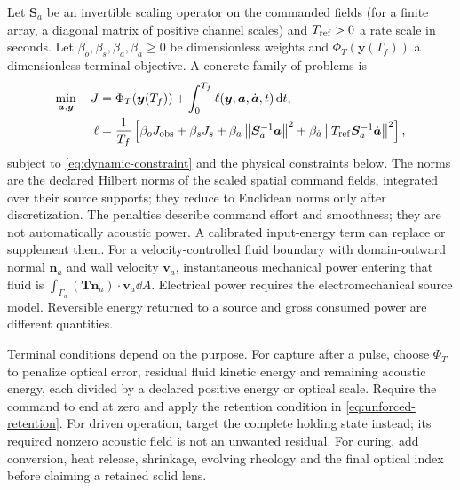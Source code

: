 Let $\bm S_a$ be an invertible scaling operator on the commanded fields
(for a finite array, a diagonal matrix of positive channel scales)
and $T_{\rm ref}>0$ a rate scale in seconds. Let
$\beta_o,\beta_s,\beta_a,\beta_{\dot a}\geq0$ be dimensionless weights and
$\Phi_T(\bm y(T_f))$ a dimensionless terminal objective. A concrete family of
problems is
\begin{align}
 \min_{\bm a,\bm y}\quad
 J&=\Phi_T(\bm y(T_f))
    +\int_0^{T_f}\ell(\bm y,\bm a,\dot{\bm a},t)\,\mathrm d t,
 \label{eq:dynamic-objective}\\
 \ell&=\frac{1}{T_f}\left[
 \beta_oJ_{\rm obs}+\beta_sJ_s
 +\beta_a\left\lVert\bm S_a^{-1}\bm a\right\rVert^2
 +\beta_{\dot a}\left\lVert T_{\rm ref}\bm S_a^{-1}\dot{\bm a}\right\rVert^2\right],
 \label{eq:running-cost}
\end{align}
subject to \cref{eq:dynamic-constraint} and the physical constraints below.
The norms are the declared Hilbert norms of the scaled spatial command
fields, integrated over their source supports; they reduce to Euclidean norms
only after discretization. The penalties describe command effort and smoothness; they are not
automatically acoustic power. A calibrated input-energy term can replace or
supplement them. For a velocity-controlled fluid boundary with domain-outward
normal $\bm n_a$ and wall velocity $\bm v_a$, instantaneous mechanical power
entering that fluid is
$\int_{\Gamma_a}(\bm T\bm n_a)\cdot\bm v_a\dd A$. Electrical power requires
the electromechanical source model. Reversible energy returned to a source and
gross consumed power are different quantities.

Terminal conditions depend on the purpose. For capture after a pulse, choose
$\Phi_T$ to penalize optical error, residual fluid kinetic energy and remaining
acoustic energy, each divided by a declared positive energy or optical scale.
Require the command to end at zero and apply the retention condition in
\cref{eq:unforced-retention}. For driven operation, target the complete holding
state instead; its required nonzero acoustic field is not an unwanted residual.
For curing, add conversion, heat release, shrinkage, evolving rheology and the
final optical index before claiming a retained solid lens.

